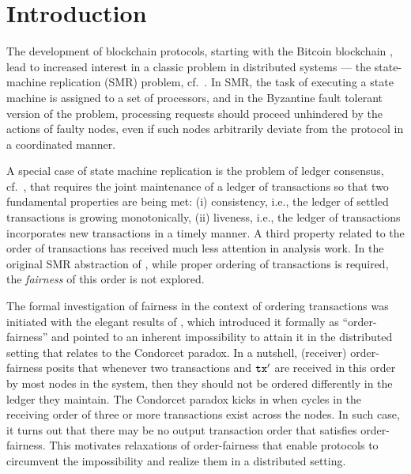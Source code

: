 \section{Introduction}
\label{sec:introduction}

The development of blockchain protocols, starting with the Bitcoin blockchain \cite{Nak08}, lead to increased interest in a classic problem in distributed systems --- the state-machine replication (SMR) problem, cf.~\cite{CSUR:Schneider90}.
%
In SMR, the task of executing a state machine is assigned to a set of processors, and in the Byzantine fault tolerant version of the problem, processing requests should proceed unhindered by the actions of faulty nodes, even if such nodes arbitrarily deviate from the protocol in a coordinated manner.

A special case of state machine replication is the problem of ledger consensus, cf.~\cite{EC:GarKiaLeo15,C:GarKiaLeo17,EC:PasSeeash17,RSA:GarKia20}, that requires the joint maintenance of a ledger of transactions so that two fundamental properties are being met: (i) consistency, i.e., the ledger of settled transactions is growing monotonically, (ii) liveness, i.e., the ledger of transactions incorporates new transactions in a timely manner.
%
A third property related to the order of transactions has received much less attention in analysis work.
%
In the original SMR abstraction of \cite{CSUR:Schneider90}, while proper ordering of transactions is required, the \emph{fairness} of this order is not explored.

The formal investigation of fairness in the context of ordering transactions was initiated with the elegant results of \cite{C:KZGJ20}, which introduced it formally as ``order-fairness'' and pointed to an inherent impossibility to attain it in the distributed setting that relates to the Condorcet paradox.
%
In a nutshell, (receiver) order-fairness posits that whenever two transactions \tx and $\mathtt{tx}'$ are received in this order by most nodes in the system, then they should not be ordered differently in the ledger they maintain.
%
The Condorcet paradox kicks in when cycles in the receiving order of three or more transactions exist across the nodes.
%
In such case, it turns out that there may be no output transaction order that satisfies order-fairness.
%
This motivates relaxations of order-fairness that enable protocols to circumvent the impossibility and realize them in a distributed setting.

